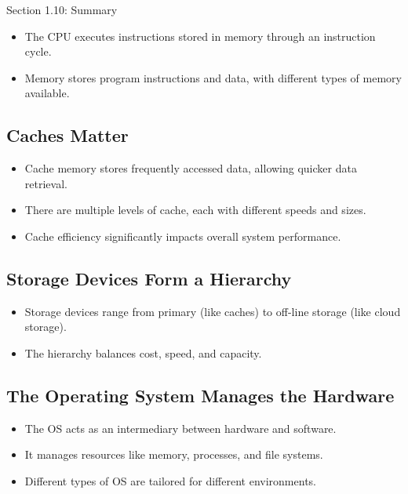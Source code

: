 \begin{notes}{Section 1.10: Summary}
    \begin{itemize}
        \item The CPU executes instructions stored in memory through an instruction cycle.
        \item Memory stores program instructions and data, with different types of memory available.
    \end{itemize}
    
    \subsection*{Caches Matter}
    
    \begin{itemize}
        \item Cache memory stores frequently accessed data, allowing quicker data retrieval.
        \item There are multiple levels of cache, each with different speeds and sizes.
        \item Cache efficiency significantly impacts overall system performance.
    \end{itemize}
    
    \subsection*{Storage Devices Form a Hierarchy}
    
    \begin{itemize}
        \item Storage devices range from primary (like caches) to off-line storage (like cloud storage).
        \item The hierarchy balances cost, speed, and capacity.
    \end{itemize}
    
    \subsection*{The Operating System Manages the Hardware}
    
    \begin{itemize}
        \item The OS acts as an intermediary between hardware and software.
        \item It manages resources like memory, processes, and file systems.
        \item Different types of OS are tailored for different environments.
    \end{itemize}
    

\end{notes}
